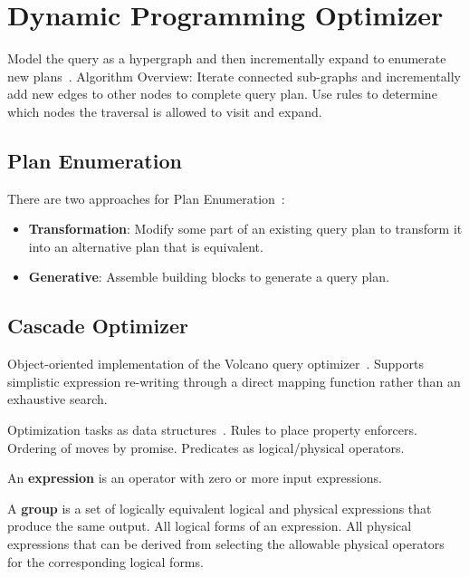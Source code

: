 \documentclass[11pt]{article}
\begin{document}
\section{Dynamic Programming Optimizer}
Model the query as a hypergraph and then incrementally expand to enumerate new plans~\cite{Moerkotte2008}. Algorithm Overview: Iterate connected sub-graphs and incrementally add new edges to other nodes to complete query plan. Use rules to determine which nodes the traversal is allowed to visit and expand.

\subsection*{Plan Enumeration}
There are two approaches for Plan Enumeration~\cite{Moerkotte2013}:
\begin{itemize}
	\item \textbf{Transformation}:
	Modify some part of an existing query plan to transform it into an alternative plan that is equivalent.
	
	\item \textbf{Generative}:
	Assemble building blocks to generate a query plan.
\end{itemize}

\subsection*{Cascade Optimizer}
Object-oriented implementation of the Volcano query optimizer~\cite{Graefe1995}. Supports simplistic expression re-writing through a direct mapping function rather than an exhaustive search.

Optimization tasks as data structures~\cite{Xu1998}. Rules to place property enforcers. Ordering of moves by promise. Predicates as logical/physical operators.

An \textbf{expression} is an operator with zero or more input expressions.

A \textbf{group} is a set of logically equivalent logical and physical expressions that produce the same output. All logical forms of an expression. All physical expressions that can be derived from selecting the allowable physical operators for the corresponding logical forms.
\end{document}
